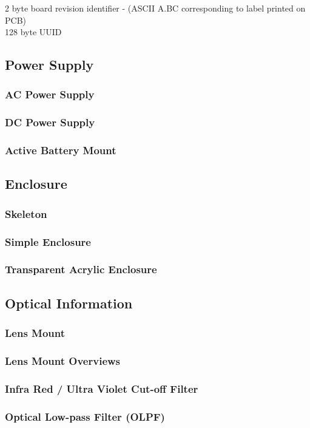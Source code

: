 2 byte board revision identifier - (ASCII A.BC corresponding to label printed on PCB)\\


128 byte UUID 




\subsection{Power Supply}
\subsubsection{AC Power Supply}
\subsubsection{DC Power Supply}
\subsubsection{Active Battery Mount}
\subsection{Enclosure}
\subsubsection{Skeleton}
\subsubsection{Simple Enclosure}
\subsubsection{Transparent Acrylic Enclosure}
\subsection{Optical Information}
\subsubsection{Lens Mount}
\subsubsection{Lens Mount Overviews}
\subsubsection{Infra Red / Ultra Violet Cut-off Filter}
\subsubsection{Optical Low-pass Filter (OLPF)}
